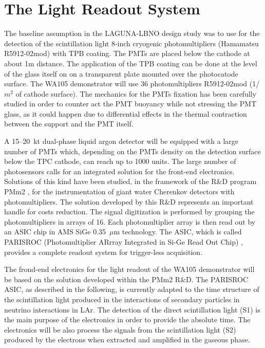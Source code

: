 \section{The Light Readout System} 
\label{sec:detectors-fd-alt-light}

The baseline assumption in the LAGUNA-LBNO design study was to use for
the detection of the scintillation light 8-inch cryogenic
photomultipliers (Hamamatsu R5912-02mod) with TPB coating. The PMTs
are placed below the cathode at about 1m distance.  The application of
the TPB coating can be done at the level of the glass itself on on a
transparent plate mounted over the photocatode surface. The WA105
demonstrator will use 36 photomultipliers R5912-02mod (1/$m^2$ of
cathode surface). The mechanics for the PMTs fixation has been
carefully studied in order to counter act the PMT buoyancy while not
stressing the PMT glass, as it could happen due to differential
effects in the thermal contraction between the support and the PMT
itself.

A 15--20~kt dual-phase liquid argon detector will be equipped with a
large number of PMTs which, depending on the PMTs density on the
detection surface below the TPC cathode, can reach up to 1000
units. The large number of photosensors calls for an integrated
solution for the front-end electronics. Solutions of this kind have
been studied, in the framework of the R\&D program PMm2 \cite{PMM2-1,
  PMM2-2}, for the instrumentation of giant water Cherenkov detectors
with photomultipliers. The solution developed by this R\&D represents
an important handle for costs reduction. The signal digitization is
performed by grouping the photomultipliers in arrays of 16. Each
photomultiplier array is then read out by an ASIC chip in AMS SiGe
0.35~$\mu$m technology. The ASIC, which is called PARISROC
(Photomultiplier ARrray Integrated in Si-Ge Read Out Chip)
\cite{Parisroc}, provides a complete readout system for trigger-less
acquisition.


The frond-end electronics for the light readout of the WA105
demonstrator will be based on the solution developed within the PMm2
R\&D. The PARISROC ASIC, as described in the following, is currently
adapted to the time structure of the scintillation light produced in
the interactions of secondary particles in neutrino interactions in
LAr. The detection of the direct scintillation light (S1) is the main
purpose of the electronics in order to provide the absolute time.  The
electronics will be also process the signals from the scintillation
light (S2) produced by the electrons when extracted and amplified in
the gaseous phase.


